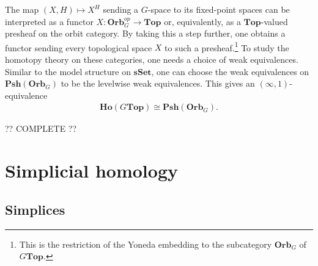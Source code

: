    \begin{theorem}[Elmendorf]
        The map $(X,H)\mapsto X^H$ sending a $G$-space to its fixed-point spaces can be interpreted as a functor $X:\mathbf{Orb}_G^{op}\rightarrow\mathbf{Top}$ or, equivalently, as a $\mathbf{Top}$-valued presheaf on the orbit category. By taking this a step further, one obtains a functor sending every topological space $X$ to such a presheaf.\footnote{This is the restriction of the Yoneda embedding to the subcategory $\mathbf{Orb}_G$ of $G\mathbf{Top}$.} To study the homotopy theory on these categories, one needs a choice of weak equivalences. Similar to the model structure on $\mathbf{sSet}$, one can choose the weak equivalences on $\mathbf{Psh}(\mathbf{Orb}_G)$ to be the levelwise weak equivalences. This gives an $(\infty,1)$-equivalence
        \begin{gather}
            \mathbf{Ho}(G\mathbf{Top})\cong\mathbf{Psh}(\mathbf{Orb}_G).
        \end{gather}
    \end{theorem}

    ?? COMPLETE ??

\section{Simplicial homology}\label{section:homology}
\subsection{Simplices}

